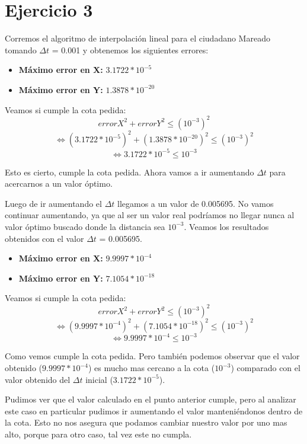 \documentclass[a4paper,10pt]{article}
\begin{document}
\section{Ejercicio 3}
\par Corremos el algoritmo de interpolación lineal para el ciudadano Mareado tomando $\Delta t$ = 0.001 y obtenemos los siguientes errores:
\begin{itemize}
	\item \textbf{Máximo error en X:} $3.1722 * 10^{-5}$
	\item \textbf{Máximo error en Y:} $1.3878 * 10^{-20}$
\end{itemize}
\par Veamos si cumple la cota pedida:
\begin{equation}
	errorX^2 + errorY^2 \leq (10^{-3})^2
\end{equation}
\begin{equation}
	\Leftrightarrow (3.1722 * 10^{-5})^2 + (1.3878 * 10^{-20})^2 \leq (10^{-3})^2
\end{equation}
\begin{equation}
	\Leftrightarrow 3.1722*10^{-5} \leq 10^{-3}
\end{equation}
\par Esto es cierto, cumple la cota pedida. Ahora vamos a ir aumentando $\Delta t$ para acercarnos a un valor óptimo.
\par Luego de ir aumentando el $\Delta t$ llegamos a un valor de 0.005695. No vamos continuar aumentando, ya que al ser un valor real podríamos no llegar nunca al valor óptimo buscado donde la distancia sea $10^{-3}$. Veamos los resultados obtenidos con el valor $\Delta t$ = 0.005695.
\begin{itemize}
	\item \textbf{Máximo error en X:} $9.9997 * 10^{-4}$
	\item \textbf{Máximo error en Y:} $7.1054 * 10^{-18}$
\end{itemize}
\par Veamos si cumple la cota pedida:
\begin{equation}
	errorX^2 + errorY^2 \leq (10^{-3})^2
\end{equation}
\begin{equation}
	\Leftrightarrow (9.9997 * 10^{-4})^2 + (7.1054 * 10^{-18})^2 \leq (10^{-3})^2
\end{equation}
\begin{equation}
	\Leftrightarrow 9.9997*10^{-4} \leq 10^{-3}
\end{equation}
\par Como vemos cumple la cota pedida. Pero también podemos observar que el valor obtenido ($9.9997*10^{-4}$) es mucho mas cercano a la cota ($10^{-3}$) comparado con el valor obtenido del $\Delta t$ inicial ($3.1722*10^{-5}$).
\par Pudimos ver que el valor calculado en el punto anterior cumple, pero al analizar este caso en particular pudimos ir aumentando el valor manteniéndonos dentro de la cota. Esto no nos asegura que podamos cambiar nuestro valor por uno mas alto, porque para otro caso, tal vez este no cumpla.
\end{document}
